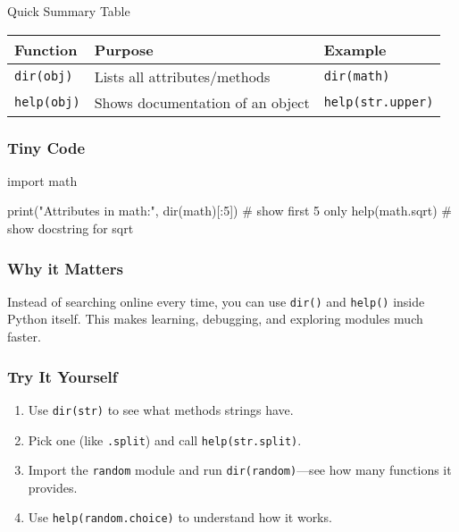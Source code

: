 \documentclass[
  letterpaper,
  DIV=11,
  numbers=noendperiod]{scrreprt}
\newenvironment{Shaded}{\begin{snugshade}}{\end{snugshade}}
\newcommand{\BuiltInTok}[1]{\textcolor[rgb]{0.00,0.23,0.31}{#1}}
\newcommand{\CommentTok}[1]{\textcolor[rgb]{0.37,0.37,0.37}{#1}}
\newcommand{\DecValTok}[1]{\textcolor[rgb]{0.68,0.00,0.00}{#1}}
\newcommand{\ImportTok}[1]{\textcolor[rgb]{0.00,0.46,0.62}{#1}}
\newcommand{\NormalTok}[1]{\textcolor[rgb]{0.00,0.23,0.31}{#1}}
\newcommand{\StringTok}[1]{\textcolor[rgb]{0.13,0.47,0.30}{#1}}
\providecommand{\tightlist}{%
  \setlength{\itemsep}{0pt}\setlength{\parskip}{0pt}}
\begin{document}
Quick Summary Table

\begin{longtable}[]{@{}lll@{}}
\toprule\noalign{}
Function & Purpose & Example \\
\midrule\noalign{}
\endhead
\bottomrule\noalign{}
\endlastfoot
\texttt{dir(obj)} & Lists all attributes/methods & \texttt{dir(math)} \\
\texttt{help(obj)} & Shows documentation of an object &
\texttt{help(str.upper)} \\
\end{longtable}

\subsubsection{Tiny Code}\label{tiny-code-44}

\begin{Shaded}
\begin{Highlighting}[]
\ImportTok{import}\NormalTok{ math}

\BuiltInTok{print}\NormalTok{(}\StringTok{"Attributes in math:"}\NormalTok{, }\BuiltInTok{dir}\NormalTok{(math)[:}\DecValTok{5}\NormalTok{])   }\CommentTok{\# show first 5 only}
\BuiltInTok{help}\NormalTok{(math.sqrt)   }\CommentTok{\# show docstring for sqrt}
\end{Highlighting}
\end{Shaded}

\subsubsection{Why it Matters}\label{why-it-matters-44}

Instead of searching online every time, you can use \texttt{dir()} and
\texttt{help()} inside Python itself. This makes learning, debugging,
and exploring modules much faster.

\subsubsection{Try It Yourself}\label{try-it-yourself-44}

\begin{enumerate}
\def\labelenumi{\arabic{enumi}.}
\tightlist
\item
  Use \texttt{dir(str)} to see what methods strings have.
\item
  Pick one (like \texttt{.split}) and call \texttt{help(str.split)}.
\item
  Import the \texttt{random} module and run \texttt{dir(random)}---see
  how many functions it provides.
\item
  Use \texttt{help(random.choice)} to understand how it works.
\end{enumerate}
\end{document}
